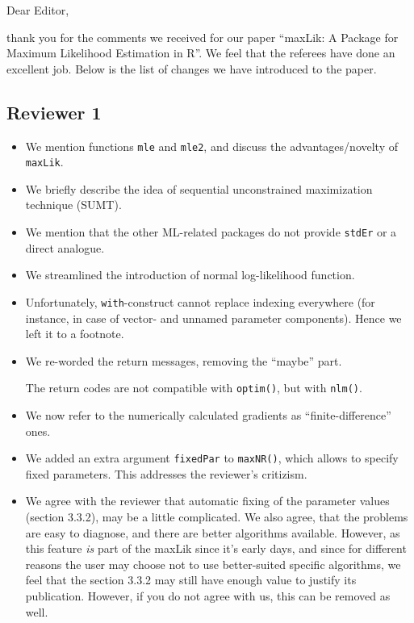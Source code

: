\documentclass[12pt,parskip=half]{scrartcl}
\begin{document}
Dear Editor,

\bigskip

thank you for the comments we received for our paper ``maxLik: A
Package for Maximum Likelihood Estimation in R''.  We feel that the
referees have done an excellent job.  Below is the list of changes we
have introduced to the paper.

\subsection*{Reviewer 1}

\begin{itemize}
\item We mention functions \texttt{mle} and \texttt{mle2}, and discuss
  the advantages/novelty of \texttt{maxLik}.
\item We briefly describe the idea of sequential unconstrained
  maximization technique (SUMT).
\item We mention that the other ML-related packages do not provide
  \texttt{stdEr} or a direct analogue.
\item We streamlined the introduction of normal log-likelihood function.
\item Unfortunately, \texttt{with}-construct cannot replace indexing
  everywhere (for instance, in case of vector- and unnamed
  parameter components).  Hence we left it to a footnote.
\item We re-worded the return messages, removing the ``maybe'' part.

  The return codes are not compatible with \texttt{optim()},
  but with \texttt{nlm()}.
\item We now refer to the numerically calculated gradients as
  ``finite-difference'' ones.
\item We added an extra argument \texttt{fixedPar} to
  \texttt{maxNR()}, which allows to specify fixed parameters.  This
  addresses the reviewer's critizism.
\item We agree with the reviewer that automatic fixing of the
  parameter values (section 3.3.2), may be a little complicated.  We
  also agree, that the problems are easy to diagnose, and there are
  better algorithms available.  However, as this feature \emph{is}
  part of the maxLik since it's early days, and since for different
  reasons
  the user may choose not to use better-suited specific algorithms, we
  feel that the section 3.3.2 may still have enough value to justify its
  publication.  However, if you do not agree with us, this can be
  removed as well.
\end{itemize}
\end{document}
